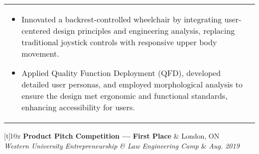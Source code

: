 \documentclass[10pt]{article}
\begin{document}
\begin{rsbox}[frametitle = {PROJECTS}]
\begin{tabularx}{\textwidth}[t]{l@{\extracolsep{\fill}}r}
{\begin{minipage}[b]{\linewidth}
\begin{itemize}[nosep]
                        \item[\bullet] 
                        Innovated a backrest-controlled wheelchair by integrating user-centered design principles and engineering analysis, replacing traditional joystick controls with responsive upper body movement.
                        \item[\bullet] 
                        Applied Quality Function Deployment (QFD), developed detailed user personas, and employed morphological analysis to ensure the design met ergonomic and functional standards, enhancing accessibility for users.
                    \end{itemize}
                \end{minipage}
            } \\
        \end{tabularx}
        \begin{tabularx}{\textwidth}[t]{l@{\extracolsep{\fill}}r}
            {\textbf{Product Pitch Competition --- First Place}} 
            & London, ON \\
            \textit{Western University Entrepreneurship \& Law Engineering Camp} & \textit{Aug. 2019} \\
             \\
        \end{tabularx}

    \end{rsbox}

\end{document}
